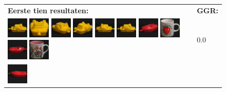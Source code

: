\begin{figure}[tbp]
\begin{center}
\begin{tabular}{m{11cm} | m{3cm} |}
\textbf{Eerste tien resultaten:} & \textbf{GGR:} \\
\vspace{4pt}
\includegraphics[width=1cm]{coil/beeld-12.eps}
\includegraphics[width=1cm]{coil/beeld-14.eps}
\includegraphics[width=1cm]{coil/beeld-16.eps}
\includegraphics[width=1cm]{coil/beeld-15.eps}
\includegraphics[width=1cm]{coil/beeld-13.eps}
\includegraphics[width=1cm]{coil/beeld-12.eps}
\includegraphics[width=1cm]{coil/beeld-21.eps}
\includegraphics[width=1cm]{coil/beeld-36.eps}
\includegraphics[width=1cm]{coil/beeld-19.eps}
\includegraphics[width=1cm]{coil/beeld-6.eps}
& {\scriptsize 0.0}
\\
\includegraphics[width=1cm]{coil/beeld-18.eps}

\end{tabular}
\end{center}
\end{figure}
